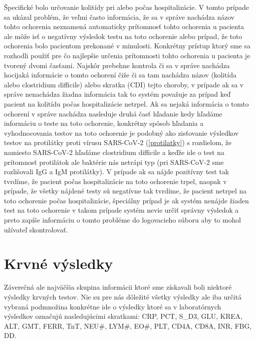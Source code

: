Špecifické bolo určovanie kolitídy pri alebo počas hospitalizácie. V tomto prípade sa ukázal problém, že veľmi často informácia, že sa v správe nachádza názov tohto ochorenia neznamená automaticky prítomnosť tohto ochorenia u pacienta ale môže isť o negatívny výsledok testu na toto ochorenie alebo prípad, že toto ochorenia bolo pacientom prekonané v minulosti. Konkrétny prístup ktorý sme sa rozhodli použiť pre čo najlepšie určenia prítomnosti tohto ochorenia u pacienta je tvorený dvomi časťami. Najskôr prebehne kontrola či sa v správe nachádza hocijaká informácie o tomto ochorení čiže či sa tam nachádza názov (kolitída alebo clostridium difficile) alebo skratka (CDI) tejto choroby, v prípade ak sa v správe nenachádza žiadna informácia tak to systém považuje za prípad keď pacient na kolitídu počas hospitalizácie netrpel. Ak sa nejaká informácia o tomto ochorení v správe nachádza nasleduje druhá časť hľadanie kedy hľadáme informáciu o teste na toto ochorenie, konkrétny spôsob hľadania a vyhodnocovania testov na toto ochorenie je podobný ako zisťovanie výsledkov testov na protilátky proti vírusu SARS-CoV-2 (\ref{protilatky}) s rozdielom, že namiesto SARS-CoV-2 hľadáme clostridium difficile a keďže ide o test na prítomnosť protilátok ale baktérie nás netrápi typ (pri SARS-CoV-2 sme rozlišovali IgG a IgM protilátky). V prípade ak sa nájde pozitívny test tak tvrdíme, že pacient počas hospitalizácie na toto ochorenie trpel, naopak v prípade, že všetky nájdené testy sú negatívne tak tvrdíme, že pacient netrpel na toto ochorenie počas hospitalizácie, špeciálny prípad je ak systém nenájde žiaden test na toto ochorenie v takom prípade systém nevie určiť správny výsledok a preto zapíše informáciu o tomto probléme do logovacieho súboru aby to mohol užívateľ skontrolovať.

\section{Krvné výsledky}

Záverečná ale najväčšia skupina informácii ktoré sme získavali boli niektoré výsledky krvných testov. Nie su pre nás dôležité všetky výsledky ale iba určitá vybraná podmnožina konkrétne ide o výsledky ktoré sa v laboratórnych výsledkov označujú nasledujúcimi skratkami: CRP, PCT, S\_D3, GLU, KREA, ALT, GMT, FERR, TnT, NEU\#, LYM\#, EO\#, PLT, CD4A, CD8A, INR, FBG, DD. 

